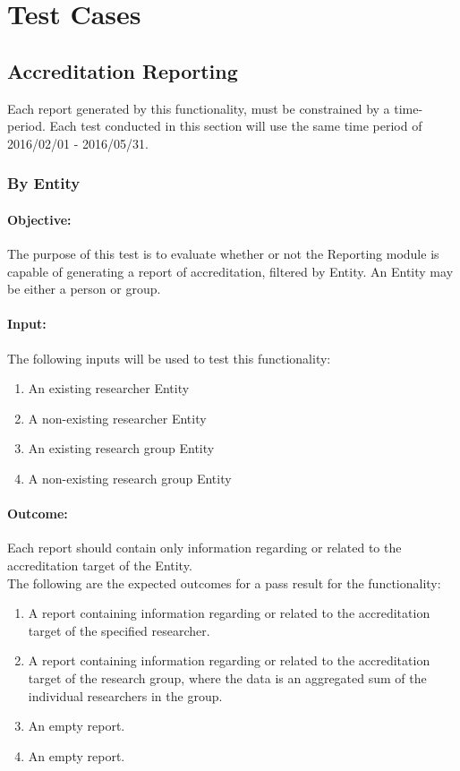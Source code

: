 \section{Test Cases}
\label{sec:testId}
\hypertarget{label}{}

\subsection{Accreditation Reporting}
Each report generated by this functionality, must be constrained by a time-period. Each test conducted in this section will use the same time period of 2016/02/01 - 2016/05/31.

\subsubsection{By Entity} \label{ti_ar_entity}
\paragraph{Objective:}
The purpose of this test is to evaluate whether or not the Reporting module is capable of
generating a report of accreditation, filtered by Entity. An Entity may be either a
person or group.
\paragraph{Input:}
The following inputs will be used to test this functionality:
\begin{enumerate}
	\item An existing researcher Entity
	\item A non-existing researcher Entity
	\item An existing research group Entity
	\item A non-existing research group Entity
\end{enumerate}
\paragraph{Outcome:}
Each report should contain only information regarding or related to the accreditation target of the Entity. \\
The following are the expected outcomes for a pass result for the functionality:
\begin{enumerate}
	\item A report containing information regarding or related to the accreditation target of the specified researcher.
	\item A report containing information regarding or related to the accreditation target of the research group, where the data is an aggregated sum of the individual researchers in the group.
	\item An empty report.
	\item An empty report.
\end{enumerate}

